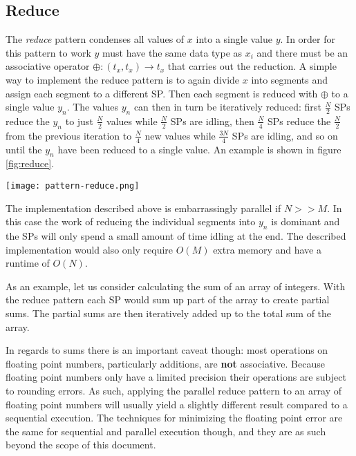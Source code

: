 \subsection{Reduce}
\label{reduce}
The \textit{reduce} pattern condenses all values of $x$ into a single value $y$.
In order for this pattern to work $y$ must have the same data type as $x_i$ and
there must be an associative operator $\oplus: (t_x, t_x) \rightarrow t_x$ that carries out the reduction.
A simple way to implement the reduce pattern is to again divide $x$ into segments and assign each segment to a different SP.
Then each segment is reduced with $\oplus$ to a single value $y_n$.
The values $y_n$ can then in turn be iteratively reduced:
first $\frac{N}{2}$ SPs reduce the $y_n$ to just $\frac{N}{2}$ values while $\frac{N}{2}$ SPs are idling,
then $\frac{N}{4}$ SPs reduce the $\frac{N}{2}$ from the previous iteration to $\frac{N}{4}$ new values while $\frac{3N}{4}$ SPs are idling,
and so on until the $y_n$ have been reduced to a single value.
An example is shown in figure \ref{fig:reduce}.
\begin{figure*}
	\centering
	\texttt{[image: pattern-reduce.png]}
	\caption{
		Visualization of the reduce pattern.
		Integers are summed up to a single value.
		In this example four streaming processors/CPU cores are used.
	}
	\label{fig:reduce}
\end{figure*}

The implementation described above is embarrassingly parallel if $N >> M$.
In this case the work of reducing the individual segments into $y_n$ is dominant
and the SPs will only spend a small amount of time idling at the end.
The described implementation would also only require $O(M)$ extra memory and have a runtime of $O(N)$.

As an example, let us consider calculating the sum of an array of integers.
With the reduce pattern each SP would sum up part of the array to create partial sums.
The partial sums are then iteratively added up to the total sum of the array.

In regards to sums there is an important caveat though:
most operations on floating point numbers, particularly additions, are \textbf{not} associative.
Because floating point numbers only have a limited precision their operations are subject to rounding errors.
As such, applying the parallel reduce pattern to an array of floating point numbers will usually yield a slightly different result
compared to a sequential execution.
The techniques for minimizing the floating point error are the same for sequential and parallel execution though,
and they are as such beyond the scope of this document.
